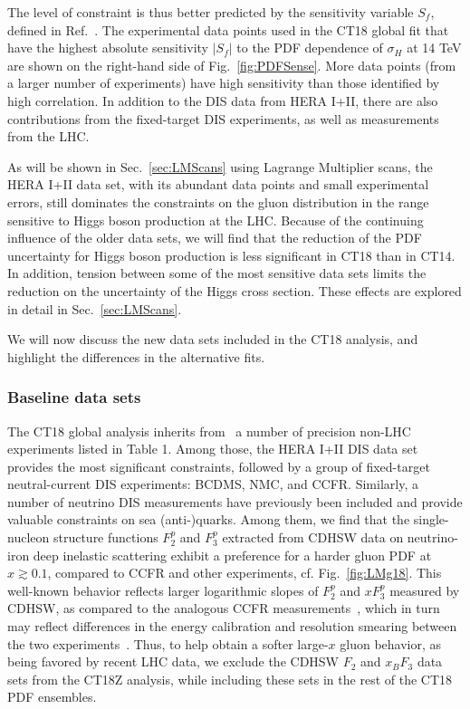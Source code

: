 The level of constraint is thus better predicted by the sensitivity variable $S_f$, defined in Ref.~\cite{Wang:2018heo}. The experimental data points used in the CT18 global fit that have the
highest absolute sensitivity $|S_f|$ to the PDF dependence of $\sigma_H$ at 14 TeV are shown on the right-hand side of Fig.~\ref{fig:PDFSense}. More data points (from a larger number of experiments) have high sensitivity
than those identified by high correlation. In addition to the DIS data from HERA I+II, there are also contributions from the fixed-target DIS experiments, as well as measurements from the LHC. 

As will be shown in Sec.~\ref{sec:LMScans} using Lagrange Multiplier scans, the HERA I+II data set, with its abundant data points and small experimental errors, still dominates the constraints on the gluon distribution in the range sensitive to Higgs boson production at the LHC. 
Because of the continuing influence of the older data sets, we will find that the reduction of the PDF uncertainty for Higgs boson production is less significant in CT18 than in CT14. In addition, tension between some of the most sensitive data sets limits the reduction on the uncertainty
of the Higgs cross section. These effects are explored in detail in Sec.~\ref{sec:LMScans}.

We will now discuss the new data sets included in the CT18 analysis, and highlight the differences in the alternative fits.


\subsubsection{Baseline data sets \label{sec:Baseline}}

The CT18 global analysis inherits from \CTHERAII~a number of precision non-LHC experiments listed in Table 1. Among those, the HERA I+II DIS data set provides the most significant constraints, followed by a group of fixed-target neutral-current DIS experiments: BCDMS, NMC, and CCFR.
Similarly, a number of neutrino DIS measurements have previously been included
and provide valuable constraints on sea (anti-)quarks.
Among them, we find that the single-nucleon structure functions $F_2^p$ and $F_3^p$ extracted from CDHSW data on neutrino-iron deep inelastic scattering exhibit a preference for a harder gluon PDF at $x \gtrsim 0.1$, compared to CCFR and other experiments, cf. Fig.~\ref{fig:LMg18}. 
This well-known behavior reflects  larger logarithmic slopes of $F_2^p$ and $x F_3^p$ measured by CDHSW, as compared to the 
analogous CCFR measurements~\cite{Seligman:1997fe}, which in turn may reflect differences in the energy calibration and resolution smearing between the two experiments~\cite{Bodek:1996zu}. 
Thus, to help obtain a softer large-$x$ gluon behavior, as being favored by recent LHC data, we exclude the CDHSW $F_2$ and $x_B F_3$ data sets from the CT18Z analysis, while including these sets in the rest of the CT18 PDF ensembles. 

